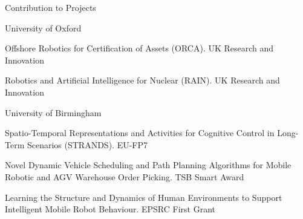 
\begin{rSection}{Contribution to Projects}

\begin{rSubsection}{University of Oxford}{}{}{}
\item Offshore Robotics for Certification of Assets (ORCA). UK Research and Innovation
\item Robotics and Artificial Intelligence for Nuclear (RAIN). UK Research and Innovation
\end{rSubsection}

\begin{rSubsection}{University of Birmingham}{}{}{}
\item Spatio-Temporal Representations and Activities for Cognitive Control in Long-Term
Scenarios (STRANDS). EU-FP7
\item Novel Dynamic Vehicle Scheduling and Path Planning Algorithms for Mobile Robotic
and AGV Warehouse Order Picking. TSB Smart Award
\item Learning the Structure and Dynamics of Human Environments to Support Intelligent
Mobile Robot Behaviour. EPSRC First Grant
\end{rSubsection}



\end{rSection}
